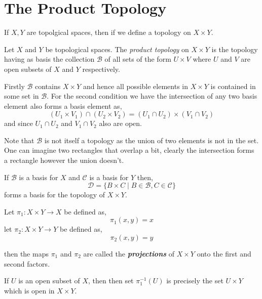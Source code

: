\section{The Product Topology}
If $X,Y$ are topolgical spaces, then if we define a topology on $X \times Y$. 
\begin{definition}
    Let $X$ and $Y$ be topological spaces. The \emph{product topology} on $X \times Y$ is the topology having as basis the collection $\mathcal{B}$ of all sets of the form $U \times V$ where $U$ and $V$ are open subsets of $X$ and $Y$ respectively.
\end{definition}

Firstly $\mathcal{B}$ contains $X \times Y$ and hence all possible elements in $X \times Y$ is contained in some set in $\mathcal{B}$. For the second condition we have the intersection of any two basis element also forms a basis element as, 
\[
    (U_{1} \times V_{1}) \cap (U_{2} \times V_{2}) = (U_{1} \cap U_{2}) \times (V_{1} \cap V_{2})
\]
and since $U_{1} \cap U_{2}$ and $V_{1} \cap V_{2}$ also are open.
\begin{note}
    Note that $\mathcal{B}$ is not itself a topology as the union of two elements is not in the set. One can  imagine two rectangles that overlap a bit, clearly the intersection forms a rectangle however the union doesn't.
\end{note}

\begin{theorem}
    If $\mathcal{B}$ is a basis for $X$ and $\mathcal{C}$ is a basis for $Y$ then, 
    \[
        \mathcal{D} = \{B \times C \mid B \in \mathcal{B}, C \in \mathcal{C}\}
    \]
    forms a basis for the topology of $X \times Y$.
\end{theorem}


\begin{definition}
    Let $\pi_{1}: X \times Y \to X$ be defined as, 
    \[
        \pi_{1}(x, y) = x
    \]
    let $\pi_2 : X \times Y \to Y$ be defined as, 
    \[
        \pi_2(x,y) = y
    \]

    then the maps $\pi_{1}$ and $\pi_{2}$ are called the \textbf{\emph{projections}} of $X \times Y$ onto the first and second factors.
\end{definition}

\vspace{1em}

If $U$ is an open subset of $X$, then then set $\pi_1^{-1}(U)$ is precisely the set $U \times Y$ which is open in $X \times Y$.


